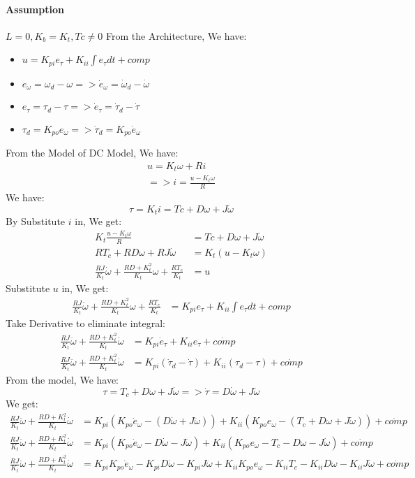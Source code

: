 	\paragraph{Assumption} $ L = 0, K_b = K_t, Tc \not= 0$
	From the Architecture, We have:
	\begin{itemize}
		\item \(u = K_{pi}e_\tau + K_{ii}\int e_\tau dt + comp\)
		\item \(e_\omega = \omega_d - \omega => \dot{e}_\omega = \dot{\omega}_d - \dot{\omega}\)
		\item \(e_\tau = \tau_d - \tau => \dot{e}_\tau = \dot{\tau}_d - \dot{\tau}\)
		\item \(\tau_d = K_{po}e_\omega => \dot{\tau}_d = K_{po}\dot{e}_\omega\)
	\end{itemize}
	From the Model of DC Model, We have:
	\[
	\begin{split}
		u = K_t\omega + Ri \\
		=> i = \frac{u - K_t\omega}{R}
	\end{split}
	\]
	We have:
	\[
	\tau = K_t i = Tc + D\omega + J\dot{\omega}
	\]
	By Substitute $ i $ in, We get:
	\[
	\begin{split}
		K_t \frac{u - K_t\omega}{R} &= Tc + D\omega + J\dot{\omega} \\
		RT_c + RD\omega + RJ\dot{\omega} &= K_t(u-K_t\omega) \\
		\frac{RJ}{K_t} \dot{\omega} + \frac{RD + K_t^2}{K_t} \omega + \frac{RT_c}{K_t} &= u
	\end{split}
	\]
	Substitute $ u $ in, We get:
	\[
	\begin{split}
		\frac{RJ}{K_t} \dot{\omega} + \frac{RD + K_t^2}{K_t} \omega + \frac{RT_c}{K_t} &= K_{pi}e_\tau + K_{ii}\int e_\tau dt + comp
	\end{split}
	\]
	Take Derivative to eliminate integral:
	\[
	\begin{split}
		\frac{RJ}{K_t} \ddot{\omega} + \frac{RD + K_t^2}{K_t} \dot{\omega} &= K_{pi}\dot{e}_\tau + K_{ii}e_\tau  + \dot{comp}\\
		\frac{RJ}{K_t} \ddot{\omega} + \frac{RD + K_t^2}{K_t} \dot{\omega} &= K_{pi}(\dot{\tau}_d - \dot{\tau}) + K_{ii}(\tau_d - \tau)  + \dot{comp}
	\end{split}
	\]
	From the model, We have:
	\[
	\tau = T_c + D\omega + J\dot{\omega} => \dot{\tau} = D\dot{\omega} + J \ddot{\omega}
	\]
	We get:
	\[
	\begin{split}
		\frac{RJ}{K_t} \ddot{\omega} + \frac{RD + K_t^2}{K_t} \dot{\omega} &= K_{pi}(K_{po}\dot{e}_\omega - (D\dot{\omega} + J \ddot{\omega})) + K_{ii}(K_{po}e_\omega - (T_c + D\omega + J\dot{\omega}))  + \dot{comp} \\	
		\frac{RJ}{K_t} \ddot{\omega} + \frac{RD + K_t^2}{K_t} \dot{\omega} &= K_{pi}(K_{po}\dot{e}_\omega - D\dot{\omega} - J \ddot{\omega}) + K_{ii}(K_{po}e_\omega - T_c - D\omega - J\dot{\omega})  + \dot{comp} \\
		\frac{RJ}{K_t} \ddot{\omega} + \frac{RD + K_t^2}{K_t} \dot{\omega} &= K_{pi}K_{po}\dot{e}_\omega - K_{pi}D\dot{\omega} - K_{pi}J \ddot{\omega} + K_{ii}K_{po}e_\omega - K_{ii}T_c - K_{ii}D\omega - K_{ii}J\dot{\omega}  + \dot{comp} \\
	\end{split}
	\]
